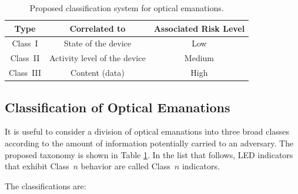 \documentclass{acmtrans2e}
\begin{document}

\begin{table}
\centering
\caption{Proposed classification system for optical emanations.}
\vspace{.1in}
\label{risk_table}
\begin{tabular}{|c|c|c|}
\hline
Type & Correlated to & Associated Risk Level
\rule{0in}{2.5ex} \\ [0.5ex]
\hline
Class~I & State of the device & Low \rule{0in}{2.5ex} \\
Class~II & Activity level of the device & Medium \\
Class~III & Content (data) & High \\
\hline
\end{tabular}
\end{table}

\subsection{Classification of Optical Emanations}

It is useful to consider a division of optical emanations into three 
broad classes according to the amount of information potentially carried 
to an adversary.  The proposed taxonomy is shown in Table \ref{risk_table}.
In the list that follows, LED indicators that exhibit
Class~$n$ behavior are called Class~$n$ indicators.

The classifications are:
\end{document}

